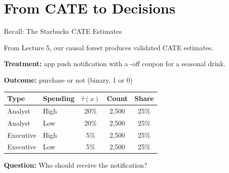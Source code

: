 \documentclass[aspectratio=169, 11pt, handout]{beamer}
\begin{document}
\section{From CATE to Decisions}

\begin{frame}{Recall: The Starbucks CATE Estimates}
 
From Lecture 5, our causal forest produces validated CATE estimates.

\medskip

\textbf{Treatment:} app push notification with a -off coupon for a seasonal drink.

\textbf{Outcome:} purchase or not (binary, 1 or 0)

\bigskip

\begin{center}
\begin{tabular}{llccc}
\toprule
\textbf{Type} & \textbf{Spending} & $\hat{\tau}(x)$ & \textbf{Count} & \textbf{Share} \\
\midrule
Analyst   & High & 20\% & 2,500 & 25\% \\
Analyst   & Low  & 20\% & 2,500 & 25\% \\
Executive & High & 5\%  & 2,500 & 25\% \\
Executive & Low  & 5\%  & 2,500 & 25\% \\
\bottomrule
\end{tabular}
\end{center}

\bigskip

\textbf{Question:} Who should receive the notification?

\end{frame}
\end{document}
